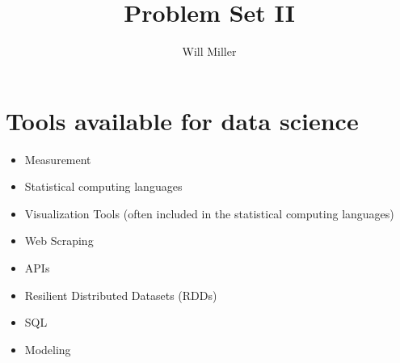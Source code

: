 \documentclass{article}
\title{Problem Set II}
\author{Will Miller}
\begin{document}
\maketitle

\section{Tools available for data science}

\begin{itemize}
    \item Measurement
    \item Statistical computing languages
    \item Visualization Tools (often included in the statistical computing languages)
    \item Web Scraping
    \item APIs
    \item Resilient Distributed Datasets (RDDs)
    \item SQL
    \item Modeling
\end{itemize}
\end{document}
